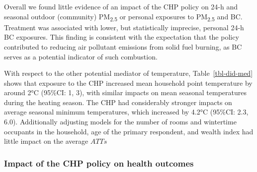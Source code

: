 \documentclass[
  letterpaper,
  DIV=11,
  numbers=noendperiod]{scrartcl}
\begin{document}
Overall we found little evidence of an impact of the CHP policy on 24-h
and seasonal outdoor (community) PM\textsubscript{2.5} or personal
exposures to PM\textsubscript{2.5} and BC. Treatment was associated with
lower, but statistically imprecise, personal 24-h BC exposures. This
finding is consistent with the expectation that the policy contributed
to reducing air pollutant emissions from solid fuel burning, as BC
serves as a potential indicator of such combustion.

With respect to the other potential mediator of temperature,
Table~\ref{tbl-did-med} shows that exposure to the CHP increased mean
household point temperature by around 2°C (95\%CI: 1, 3), with similar
impacts on mean seasonal temperatures during the heating season. The CHP
had considerably stronger impacts on average seasonal minimum
temperatures, which increased by 4.2°C (95\%CI: 2.3, 6.0). Additionally
adjusting models for the number of rooms and wintertime occupants in the
household, age of the primary respondent, and wealth index had little
impact on the average \(ATTs\)

\subsubsection{Impact of the CHP policy on health
outcomes}\label{impact-of-the-chp-policy-on-health-outcomes}
\end{document}
